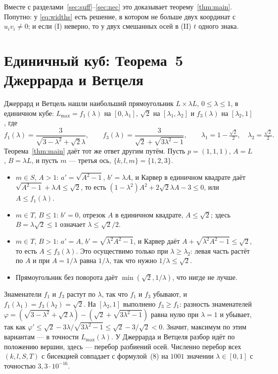 \documentclass[11pt]{article}
\theoremstyle{definition}
\theoremstyle{remark}
\begin{document}
Вместе с разделами~\ref{sec:suff}--\ref{sec:nec} это доказывает теорему~\ref{thm:main}. Попутно: у
\eqref{eq:widths} есть решение, в котором не больше двух координат с $u_iv_i\ne0$; и если (I) неверно, то у двух
смешанных осей в (II) $t$ одного знака.

\section{Единичный куб: Теорема~5 Джеррарда и Ветцеля}\label{sec:jw}

Джеррард и Ветцель \cite[Theorem~5, формула~(8)]{JerrardWetzel2004} нашли наибольший прямоугольник
$L\times\lambda L$, $0\le\lambda\le1$, в единичном кубе: $L_{\max}=f_1(\lambda)$ на $[0,\lambda_1]$,
$\sqrt2$ на $[\lambda_1,\lambda_2]$ и $f_3(\lambda)$ на $[\lambda_2,1]$, где
\[
f_1(\lambda)=\frac{3}{\sqrt{3-\lambda^2}+\sqrt2\lambda},\qquad f_3(\lambda)=\frac{3}{\sqrt2+\sqrt{3\lambda^2-1}},\qquad
\lambda_1=1-\tfrac{\sqrt2}{2},\quad \lambda_2=\tfrac{\sqrt2}{2}.
\]
Теорема~\ref{thm:main} даёт тот же ответ другим путём. Пусть $p=(1,1,1)$, $A=L$, $B=\lambda L$, и пусть $m$ ---
третья ось, $\{k,l,m\}=\{1,2,3\}$.
\begin{itemize}
\item $m\in S$, $A>1$: $a'=\sqrt{A^2-1}$, $b'=\lambda A$, и Карвер в единичном квадрате даёт
$\sqrt{A^2-1}+\lambda A\le\sqrt2$, то есть $(1-\lambda^2)A^2+2\sqrt2\lambda A-3\le0$, или $A\le f_1(\lambda)$.
\item $m\in T$, $B\le1$: $b'=0$, отрезок $A$ в единичном квадрате, $A\le\sqrt2$; здесь $B=\lambda\sqrt2\le1$
означает $\lambda\le\sqrt2/2$.
\item $m\in T$, $B>1$: $a'=A$, $b'=\sqrt{\lambda^2A^2-1}$, и Карвер даёт $A+\sqrt{\lambda^2A^2-1}\le\sqrt2$, то есть
$A\le f_3(\lambda)$. Это осуществимо только при $\lambda\ge\lambda_2$: левая часть растёт по $A$ и при $A=1/\lambda$
равна $1/\lambda$, так что нужно $1/\lambda\le\sqrt2$.
\item Прямоугольник без поворота даёт $\min(\sqrt2,1/\lambda)$, что нигде не лучше.
\end{itemize}
Знаменатели $f_1$ и $f_3$ растут по $\lambda$, так что $f_1$ и $f_3$ убывают, и $f_1(\lambda_1)=f_3(\lambda_2)=\sqrt2$.
На $[\lambda_2,1]$ выполнено $f_3\ge f_1$: разность знаменателей
$\varphi=(\sqrt{3-\lambda^2}+\sqrt2\lambda)-(\sqrt2+\sqrt{3\lambda^2-1})$ равна нулю при $\lambda=1$ и убывает, так как
$\varphi'\le\sqrt2-3\lambda/\sqrt{3\lambda^2-1}\le\sqrt2-3/\sqrt2<0$. Значит, максимум по этим вариантам --- в
точности $L_{\max}(\lambda)$. У Джеррарда и Ветцеля разбор идёт по положению вершин, здесь --- перебор
разбиений осей. Численно перебор всех $(k,l,S,T)$ с бисекцией совпадает с формулой~(8) на $1001$ значении
$\lambda\in[0,1]$ с точностью $3{,}3\cdot10^{-16}$.
\end{document}
